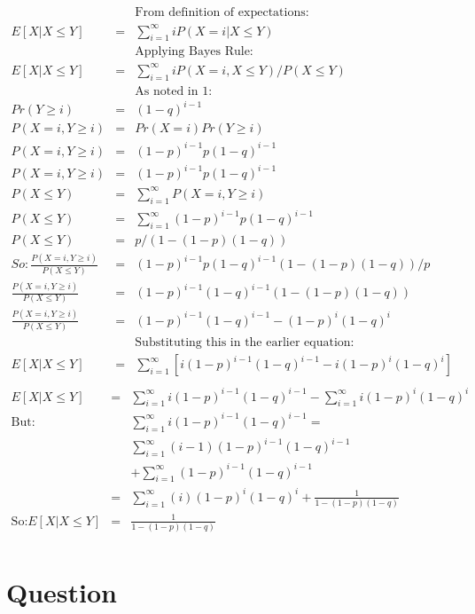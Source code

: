 \documentclass[10pt]{article}
\begin{document}
\begin{eqnarray}
&&\text{From definition of expectations:}\\
E[X|X\leq Y] &=& \sum_{i=1}^{\infty} iP(X=i|X\leq Y)\\
&&\text{Applying Bayes Rule:}\\
E[X|X\leq Y] &=& \sum_{i=1}^{\infty} iP(X=i,X\leq Y)/P(X\leq Y)\\
&&\text{As noted in 1:}\\
Pr(Y \geq i) &=& (1-q)^{i-1}\\
P(X=i,Y \geq i) &=& Pr(X=i)Pr(Y \geq i)\\
P(X=i,Y \geq i) &=& (1-p)^{i-1}p(1-q)^{i-1}\\
P(X=i,Y \geq i) &=& (1-p)^{i-1}p(1-q)^{i-1}\\
P(X\leq Y) &=& \sum_{i=1}^{\infty} P(X=i,Y \geq i)\\
P(X\leq Y) &=& \sum_{i=1}^{\infty} (1-p)^{i-1}p(1-q)^{i-1}\\
P(X\leq Y) &=& p/(1-(1-p)(1-q))\\
So: \frac{P(X=i,Y \geq i)}{P(X\leq Y)} &=& (1-p)^{i-1}p(1-q)^{i-1}(1-(1-p)(1-q))/p\\
\frac{P(X=i,Y \geq i)}{P(X\leq Y)} &=& (1-p)^{i-1}(1-q)^{i-1}(1-(1-p)(1-q))\\
\frac{P(X=i,Y \geq i)}{P(X\leq Y)} &=& (1-p)^{i-1}(1-q)^{i-1}-(1-p)^{i}(1-q)^{i}\\
&&\text{Substituting this in the earlier equation:}\\
E[X|X\leq Y] &=& \sum_{i=1}^{\infty} [i(1-p)^{i-1}(1-q)^{i-1}-i(1-p)^{i}(1-q)^{i}]\\
\end{eqnarray}
\begin{eqnarray}
E[X|X\leq Y] &=& \sum_{i=1}^{\infty} i(1-p)^{i-1}(1-q)^{i-1}-\sum_{i=1}^{\infty}i(1-p)^{i}(1-q)^{i}\\
\text{But:}&&\sum_{i=1}^{\infty} i(1-p)^{i-1}(1-q)^{i-1} = \\
&& \sum_{i=1}^{\infty} (i-1)(1-p)^{i-1}(1-q)^{i-1} \\
&&+ \sum_{i=1}^{\infty} (1-p)^{i-1}(1-q)^{i-1}\\
&=& \sum_{i=1}^{\infty} (i)(1-p)^{i}(1-q)^{i} + \frac{1}{1-(1-p)(1-q)}\\
\text{So:}E[X|X\leq Y] &=& \frac{1}{1-(1-p)(1-q)}\\
\end{eqnarray}

\section{Question}
\end{document}
